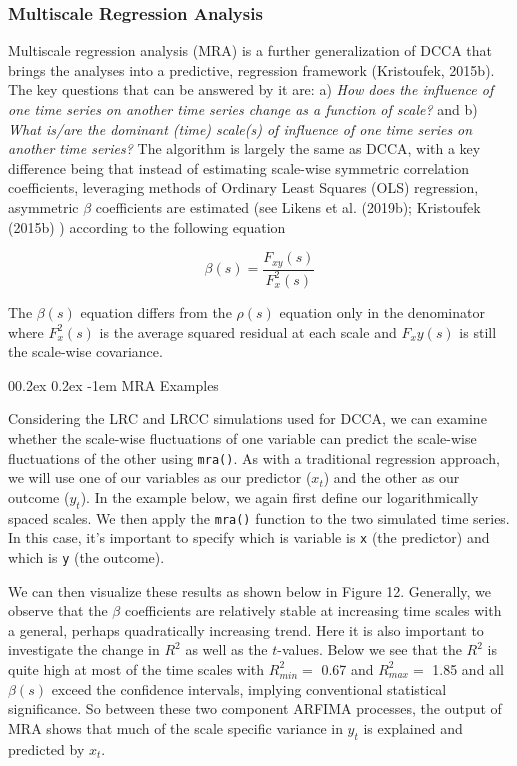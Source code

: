 \documentclass[
  man]{apa6}
\makeatletter
\let\oldparagraph\paragraph
\renewcommand{\paragraph}[1]{\oldparagraph{#1}\mbox{}}
\renewcommand{\paragraph}{\@startsection{paragraph}{4}{\parindent}%
  {0\baselineskip \@plus 0.2ex \@minus 0.2ex}%
  {-1em}%
  {\normalfont\normalsize\bfseries\itshape\typesectitle}}
\makeatother
\begin{document}
\hypertarget{multiscale-regression-analysis}{%
\subsubsection{Multiscale Regression Analysis}\label{multiscale-regression-analysis}}

Multiscale regression analysis (MRA) is a further generalization of DCCA
that brings the analyses into a predictive, regression framework
(Kristoufek, 2015b). The key questions that can be answered by it are: a)
\emph{How does the influence of one time series on another time series change
as a function of scale?} and b) \emph{What is/are the dominant (time)
scale(s) of influence of one time series on another time series?} The
algorithm is largely the same as DCCA, with a key difference being that
instead of estimating scale-wise symmetric correlation coefficients,
leveraging methods of Ordinary Least Squares (OLS) regression,
asymmetric \(\beta\) coefficients are estimated (see Likens et al. (2019b);
Kristoufek (2015b) ) according to the following equation

\[
\beta(s)=\frac{F_{xy}(s)}{F^2_x(s)}
\]

The \(\beta(s)\) equation differs from the \(\rho(s)\) equation only in the
denominator where \(F^2_x(s)\) is the average squared residual at each
scale and \(F_xy(s)\) is still the scale-wise covariance.

\hypertarget{mra-examples}{%
\paragraph{MRA Examples}\label{mra-examples}}

Considering the LRC and LRCC simulations used for DCCA, we can examine
whether the scale-wise fluctuations of one variable can predict the
scale-wise fluctuations of the other using \texttt{mra()}. As with a
traditional regression approach, we will use one of our variables as our
predictor (\(x_t\)) and the other as our outcome (\(y_t\)). In the example
below, we again first define our logarithmically spaced scales. We then
apply the \texttt{mra()} function to the two simulated time series. In this
case, it's important to specify which is variable is \texttt{x} (the predictor)
and which is \texttt{y} (the outcome).

We can then visualize these results as shown below in Figure 12.
Generally, we observe that the \(\beta\) coefficients are relatively
stable at increasing time scales with a general, perhaps quadratically
increasing trend. Here it is also important to investigate the change in
\(R^2\) as well as the \(t\)-values. Below we see that the \(R^2\) is quite
high at most of the time scales with \(R^2_{min} =\)
0.67 and \(R^2_{max} =\)
1.85 and all \(\beta(s)\) exceed the confidence
intervals, implying conventional statistical significance. So between
these two component ARFIMA processes, the output of MRA shows that much
of the scale specific variance in \(y_t\) is explained and predicted by
\(x_t\).
\end{document}
